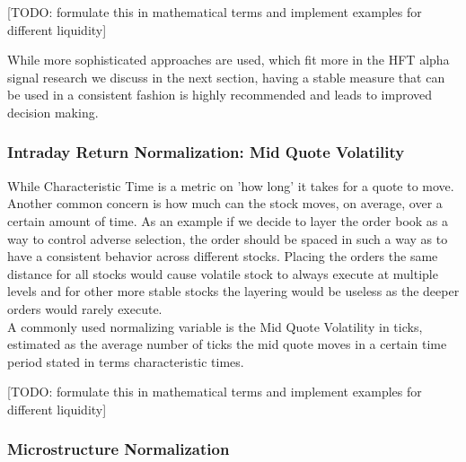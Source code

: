 [TODO: formulate this in mathematical terms and implement examples for different liquidity]


While more sophisticated approaches are used, which fit more in the HFT alpha signal research we discuss in the next section, having a stable measure that can be used in a consistent fashion is highly recommended and leads to improved decision making.


\subsubsection{Intraday Return Normalization: Mid Quote Volatility}

While Characteristic Time is a metric on 'how long' it takes for a quote to move. Another common concern is how much can the stock moves, on average, over a certain amount of time. As an example if we decide to layer the order book as a way to control adverse selection, the order should be spaced in such a way as to have a consistent behavior across different stocks. Placing the orders the same distance for all stocks would cause volatile stock to always execute at multiple levels and for other more stable stocks the layering would be useless as the deeper orders would rarely execute.  \\

 
A commonly used normalizing variable is the Mid Quote Volatility in ticks, estimated as the average number of ticks the mid quote moves in a certain time period stated in terms characteristic times.


[TODO: formulate this in mathematical terms and implement examples for different liquidity]


\subsubsection{Microstructure Normalization}

